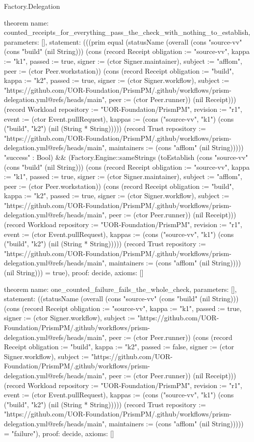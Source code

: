 \begin{lexlean}{Factory.Delegation}
\begin{semanticmodule}
theorem{
  name: counted_receipts_for_everything_pass_the_check_with_nothing_to_establish,
  parameters: [],
  statement: (((prim equal (statusName (overall (cons "source-vv" (cons "build" (nil String))) (cons (record Receipt {obligation := "source-vv", kappa := "k1", passed := true, signer := (ctor Signer.maintainer), subject := "afflom", peer := (ctor Peer.workstation)}) (cons (record Receipt {obligation := "build", kappa := "k2", passed := true, signer := (ctor Signer.workflow), subject := "https://github.com/UOR-Foundation/PrismPM/.github/workflows/prism-delegation.yml@refs/heads/main", peer := (ctor Peer.runner)}) (nil Receipt))) (record Workload {repository := "UOR-Foundation/PrismPM", revision := "r1", event := (ctor Event.pullRequest), kappas := (cons ("source-vv", "k1") (cons ("build", "k2") (nil (String * String))))}) (record Trust {repository := "https://github.com/UOR-Foundation/PrismPM/.github/workflows/prism-delegation.yml@refs/heads/main", maintainers := (cons "afflom" (nil String))}))) "success" : Bool) && (Factory.Engine::sameStrings (toEstablish (cons "source-vv" (cons "build" (nil String))) (cons (record Receipt {obligation := "source-vv", kappa := "k1", passed := true, signer := (ctor Signer.maintainer), subject := "afflom", peer := (ctor Peer.workstation)}) (cons (record Receipt {obligation := "build", kappa := "k2", passed := true, signer := (ctor Signer.workflow), subject := "https://github.com/UOR-Foundation/PrismPM/.github/workflows/prism-delegation.yml@refs/heads/main", peer := (ctor Peer.runner)}) (nil Receipt))) (record Workload {repository := "UOR-Foundation/PrismPM", revision := "r1", event := (ctor Event.pullRequest), kappas := (cons ("source-vv", "k1") (cons ("build", "k2") (nil (String * String))))}) (record Trust {repository := "https://github.com/UOR-Foundation/PrismPM/.github/workflows/prism-delegation.yml@refs/heads/main", maintainers := (cons "afflom" (nil String))})) (nil String))) = true),
  proof: decide{},
  axioms: []
}

theorem{
  name: one_counted_failure_fails_the_whole_check,
  parameters: [],
  statement: ((statusName (overall (cons "source-vv" (cons "build" (nil String))) (cons (record Receipt {obligation := "source-vv", kappa := "k1", passed := true, signer := (ctor Signer.workflow), subject := "https://github.com/UOR-Foundation/PrismPM/.github/workflows/prism-delegation.yml@refs/heads/main", peer := (ctor Peer.runner)}) (cons (record Receipt {obligation := "build", kappa := "k2", passed := false, signer := (ctor Signer.workflow), subject := "https://github.com/UOR-Foundation/PrismPM/.github/workflows/prism-delegation.yml@refs/heads/main", peer := (ctor Peer.runner)}) (nil Receipt))) (record Workload {repository := "UOR-Foundation/PrismPM", revision := "r1", event := (ctor Event.pullRequest), kappas := (cons ("source-vv", "k1") (cons ("build", "k2") (nil (String * String))))}) (record Trust {repository := "https://github.com/UOR-Foundation/PrismPM/.github/workflows/prism-delegation.yml@refs/heads/main", maintainers := (cons "afflom" (nil String))}))) = "failure"),
  proof: decide{},
  axioms: []
}


\end{semanticmodule}
\end{lexlean}
